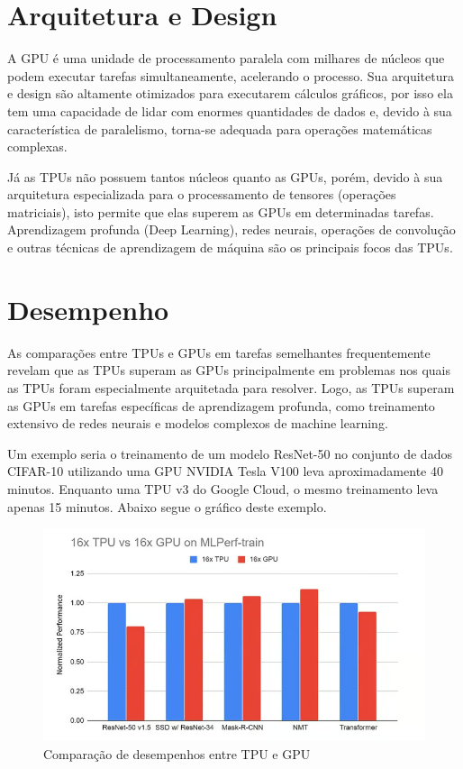 \documentclass{report}
\begin{document}
\section{Arquitetura e Design}

\setlength{\parskip}{1em}\hspace{0.5cm} A GPU é uma unidade de processamento paralela com milhares de núcleos que podem executar tarefas simultaneamente, acelerando o processo. Sua arquitetura e design são altamente otimizados para executarem cálculos gráficos, por isso ela tem uma capacidade de lidar com enormes quantidades de dados e, devido à sua característica de paralelismo, torna-se adequada para operações matemáticas complexas.

Já as TPUs não possuem tantos núcleos quanto as GPUs, porém, devido à sua arquitetura especializada para o processamento de tensores (operações matriciais), isto permite que elas superem as GPUs em determinadas tarefas. Aprendizagem profunda (Deep Learning), redes neurais, operações de convolução e outras técnicas de aprendizagem de máquina são os principais focos das TPUs.

\section{Desempenho}

\setlength{\parskip}{1em}\hspace{0.5cm} As comparações entre TPUs e GPUs em tarefas semelhantes frequentemente revelam que as TPUs superam as GPUs principalmente em problemas nos quais as TPUs foram especialmente arquitetada para resolver. Logo, as TPUs superam as GPUs em tarefas específicas de aprendizagem profunda, como treinamento extensivo de redes neurais e modelos complexos de machine learning.

Um exemplo seria o treinamento de um modelo ResNet-50 no conjunto de dados CIFAR-10 utilizando uma GPU NVIDIA Tesla V100 leva aproximadamente 40 minutos. Enquanto uma TPU v3 do Google Cloud, o mesmo treinamento leva apenas 15 minutos. Abaixo segue o gráfico deste exemplo.

\begin{figure}[h]
	\includegraphics[scale=0.7]{Desempenho}
	\centering
	\caption{Comparação de desempenhos entre TPU e GPU}
\end{figure}
\end{document}
